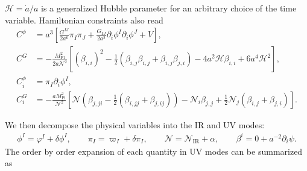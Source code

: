 \documentclass[aps, prd
, preprint
, nofootinbib 
, notitlepage
, longbibliography
]{revtex4-1}
\newcommand{\Mpl}{M_\text{Pl}}
\newcommand{\IR}{\text{IR}}
\newcommand{\calH}{\mathcal{H}}
\newcommand{\calN}{\mathcal{N}}
\newcommand{\dphi}{\delta\phi}
\newcommand{\dpi}{\delta\pi}
\newcommand{\bae}[1]{\begin{align} #1 \end{align}}
\begin{document}
$\calH=\dot{a}/a$ is a generalized Hubble parameter for an arbitrary choice of the time variable.
Hamiltonian constraints also read
\bae{
    C^\phi&=a^3\left[\frac{G^{IJ}}{2a^6}\pi_I\pi_J+\frac{G_{IJ}}{2a^2}\partial_i\phi^I\partial_i\phi^J+V\right], \\
    C^G&=-\frac{\Mpl^2}{2a\calN^2}\left[(\beta_{i,i})^2-\frac{1}{2}(\beta_{i,j}\beta_{i,j}+\beta_{i,j}\beta_{j,i})-4a^2\calH\beta_{i,i}+6a^4\calH^2\right], \\
    C_i^\phi&=\pi_I\partial_i\phi^I, \\
    C_i^G&=-\frac{a\Mpl^2}{\calN^2}\left[\calN\left(\beta_{j,ji}-\frac{1}{2}(\beta_{i,jj}+\beta_{j,ij})\right)-\calN_i\beta_{j,j}+\frac{1}{2}\calN_j(\beta_{i,j}+\beta_{j,i})\right].
}

We then decompose the physical variables into the IR and UV modes:
\bae{
    \phi^I=\varphi^I+\dphi^I, \qquad \pi_I=\varpi_I+\dpi_I, \qquad \calN=\calN_\IR+\alpha, \qquad \beta^i=0+a^{-2}\partial_i\psi.
}
The order by order expansion of each quantity in UV modes can be summarized as
\end{document}
